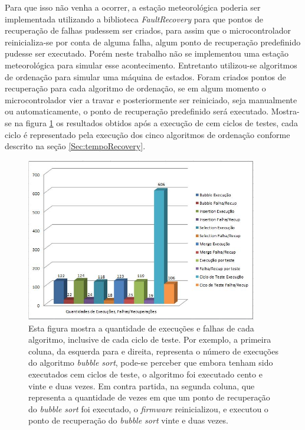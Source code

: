 Para que isso não venha a ocorrer, a estação meteorológica poderia ser implementada utilizando a biblioteca \textit{FaultRecovery} para que pontos de recuperação de falhas pudessem ser criados, para assim que o microcontrolador reinicializa-se por conta de alguma falha, algum ponto de recuperação predefinido pudesse ser executado. Porém neste trabalho não se implementou uma estação meteorológica para simular esse acontecimento. Entretanto utilizou-se algoritmos de ordenação para simular uma máquina de estados. Foram criados pontos de recuperação para cada algoritmo de ordenação, se em algum momento o microcontrolador vier a travar e posteriormente ser reiniciado, seja manualmente ou automaticamente, o ponto de recuperação predefinido será executado. Mostra-se na figura \ref{Img:testeFaultRecovery} os resultados obtidos após a execução de cem ciclos de testes, cada ciclo é representado pela execução dos cinco algoritmos de ordenação conforme descrito na seção \ref{Sec:tempoRecovery}. 


\begin{figure}[h]
	\centering
	\includegraphics[width=0.9\textwidth]{figuras/testeFaultRecovery.jpg}
	\caption[Resultados Obtidos da Biblioteca \textit{FaultRecovery}]{Esta figura mostra a quantidade de execuções e falhas de cada algoritmo, inclusive de cada ciclo de teste. Por exemplo, a primeira coluna, da esquerda para e direita, representa o número de execuções do algoritmo \textit{bubble sort}, pode-se perceber que embora tenham sido executados cem ciclos de teste, o algoritmo foi executado cento e vinte e duas vezes. Em contra partida, na segunda coluna, que representa a quantidade de vezes em que um ponto de recuperação do \textit{bubble sort} foi executado, o \textit{firmware} reinicializou, e executou o ponto de recuperação do \textit{bubble sort} vinte e duas vezes.}
	\label{Img:testeFaultRecovery}	
\end{figure}


